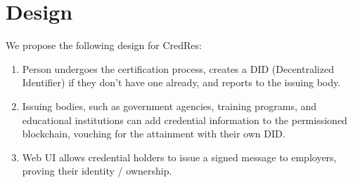 \section{Design}

We propose the following design for CredRes:
\begin{enumerate}
    \item Person undergoes the certification process, creates a DID (Decentralized Identifier) if they don’t have one already, and reports to the issuing body.
    \item Issuing bodies, such as government agencies, training programs, and educational institutions can add credential information to the permissioned blockchain, vouching for the attainment with their own DID.
    \item Web UI allows credential holders to issue a signed message to employers, proving their identity / ownership.
\end{enumerate}

